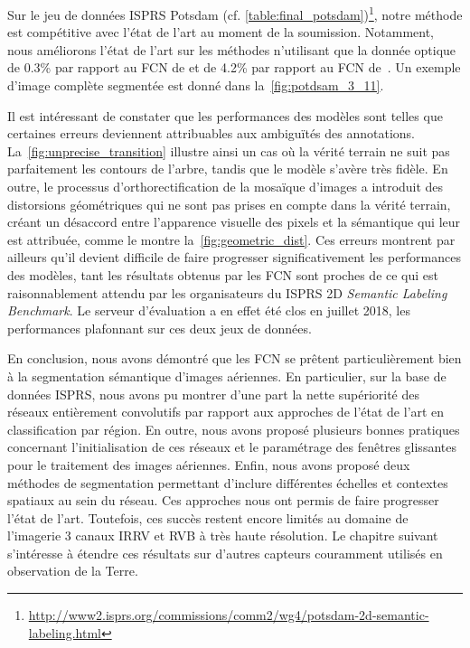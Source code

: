 Sur le jeu de données \gls{ISPRS} Potsdam (cf. \cref{table:final_potsdam})\footnote{\url{http://www2.isprs.org/commissions/comm2/wg4/potsdam-2d-semantic-labeling.html}}, notre méthode est compétitive avec l'état de l'art au moment de la soumission. Notamment, nous améliorons l'état de l'art sur les méthodes n'utilisant que la donnée optique de \num{0,3}\% par rapport au \gls{FCN} de \citet{sherrah_fully_2016} et de \num{4,2}\% par rapport au \gls{FCN} de~\citet{volpi_dense_2017}. Un exemple d'image complète segmentée est donné dans la~\cref{fig:potdsam_3_11}.

Il est intéressant de constater que les performances des modèles sont telles que certaines erreurs deviennent attribuables aux ambiguïtés des annotations. La~\cref{fig:unprecise_transition} illustre ainsi un cas où la vérité terrain ne suit pas parfaitement les contours de l'arbre, tandis que le modèle s'avère très fidèle. En outre, le processus d'orthorectification de la mosaïque d'images a introduit des distorsions géométriques qui ne sont pas prises en compte dans la vérité terrain, créant un désaccord entre l'apparence visuelle des pixels et la sémantique qui leur est attribuée, comme le montre la~\cref{fig:geometric_dist}. Ces erreurs montrent par ailleurs qu'il devient difficile de faire progresser significativement les performances des modèles, tant les résultats obtenus par les \gls{FCN} sont proches de ce qui est raisonnablement attendu par les organisateurs du \gls{ISPRS} 2D \emph{Semantic Labeling Benchmark}. Le serveur d'évaluation a en effet été clos en juillet 2018, les performances plafonnant sur ces deux jeux de données.

En conclusion, nous avons démontré que les \gls{FCN} se prêtent particulièrement bien à la segmentation sémantique d'images aériennes. En particulier, sur la base de données \gls{ISPRS}, nous avons pu montrer d'une part la nette supériorité des réseaux entièrement convolutifs par rapport aux approches de l'état de l'art en classification par région. En outre, nous avons proposé plusieurs bonnes pratiques concernant l'initialisation de ces réseaux et le paramétrage des fenêtres glissantes pour le traitement des images aériennes. Enfin, nous avons proposé deux méthodes de segmentation permettant d'inclure différentes échelles et contextes spatiaux au sein du réseau. Ces approches nous ont permis de faire progresser l'état de l'art. Toutefois, ces succès restent encore limités au domaine de l'imagerie 3 canaux \gls{IRRV} et \gls{RVB} à très haute résolution. Le chapitre suivant s'intéresse à étendre ces résultats sur d'autres capteurs couramment utilisés en observation de la Terre.


%
%
\printbibliography[heading=subbibliography]

